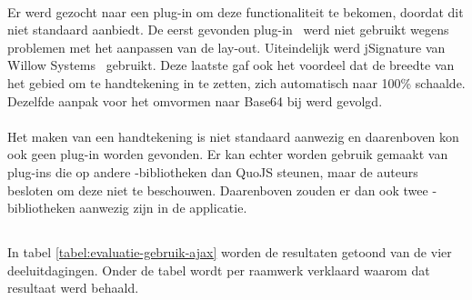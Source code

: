 \paragraph{\jqm}
Er werd gezocht naar een plug-in om deze functionaliteit te bekomen, doordat \jqm{} dit niet standaard aanbiedt. 
De eerst gevonden plug-in~\cite{Bradley2013} werd niet gebruikt wegens problemen met het aanpassen van de lay-out.
Uiteindelijk werd jSignature van Willow Systems~\cite{Systems2013} gebruikt.
Deze laatste gaf ook het voordeel dat de breedte van het gebied om te handtekening in te zetten, zich automatisch naar 100\% schaalde. 
Dezelfde aanpak voor het omvormen naar Base64 bij \kendo{} werd gevolgd.

\paragraph{\lungo}
Het maken van een handtekening is niet standaard aanwezig en daarenboven kon ook geen plug-in worden gevonden.
Er kan echter worden gebruik gemaakt van plug-ins die op andere \js{}-bibliotheken dan QuoJS steunen, maar de auteurs besloten om deze niet te beschouwen.
Daarenboven zouden er dan ook twee \js{}-bibliotheken aanwezig zijn in de applicatie.



\subsection{}
\label{sec:evaluatie-gebruik-ajax}

In tabel \ref{tabel:evaluatie-gebruik-ajax} worden de resultaten getoond van de vier deeluitdagingen.
Onder de tabel wordt per raamwerk verklaard waarom dat resultaat werd behaald.

\begin{table}
\centering
{}
\caption{Gebruik van .}
\label{tabel:evaluatie-gebruik-ajax}
\end{table}

